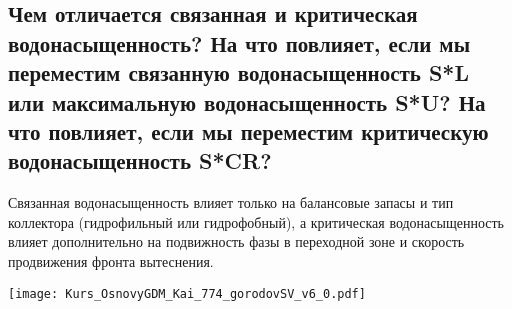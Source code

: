 

\subsection{Чем отличается связанная и критическая водонасыщенность? На что повлияет, если мы переместим связанную водонасыщенность S*L или максимальную водонасыщенность S*U? На что повлияет, если мы переместим критическую водонасыщенность S*CR?}

Связанная водонасыщенность влияет только на балансовые запасы и тип коллектора (гидрофильный или гидрофобный), а критическая водонасыщенность влияет дополнительно на подвижность фазы в переходной зоне и скорость продвижения фронта вытеснения.

\texttt{[image: Kurs\_OsnovyGDM\_Kai\_774\_gorodovSV\_v6\_0.pdf]}

